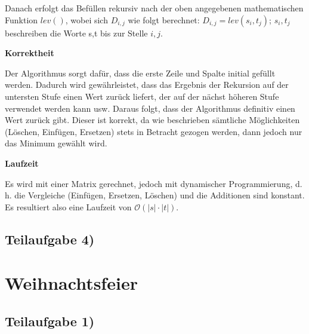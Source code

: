 \documentclass[a4paper, fontsize=10pt]{scrartcl}
\begin{document}
Danach erfolgt das Befüllen rekursiv nach der oben angegebenen mathematischen Funktion $lev()$, wobei sich $D_{i,j}$ wie folgt berechnet:
$D_{i,j}=lev(s_{i},t_{j})$; $s_{i}, t_{j}$ beschreiben die Worte s,t bis zur Stelle $i,j$. \bigskip

\textbf{Korrektheit}\smallskip

Der Algorithmus sorgt dafür, dass die erste Zeile und Spalte initial gefüllt werden. Dadurch wird gewährleistet, dass das Ergebnis der Rekursion auf der untersten Stufe einen Wert zurück liefert, der auf der nächst höheren Stufe verwendet werden kann usw. Daraus folgt, dass der Algorithmus definitiv einen Wert zurück gibt. Dieser ist korrekt, da wie beschrieben sämtliche Möglichkeiten (Löschen, Einfügen, Ersetzen) stets in Betracht gezogen werden, dann jedoch nur das Minimum gewählt wird.\bigskip

\textbf{Laufzeit}\smallskip

Es wird mit einer Matrix gerechnet, jedoch mit dynamischer Programmierung, d. h. die Vergleiche (Einfügen, Ersetzen, Löschen) und die Additionen sind konstant. Es resultiert also eine Laufzeit von $\mathcal{O}(|s|\cdot|t|)$.

\newpage

\subsection*{Teilaufgabe 4)}



\newpage

\section*{Weihnachtsfeier}
\subsection*{Teilaufgabe 1)}

\end{document}
